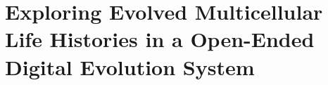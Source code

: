 \chapter{Exploring Evolved Multicellular Life Histories in a Open-Ended Digital Evolution System}
\label{chap:case-studies}

